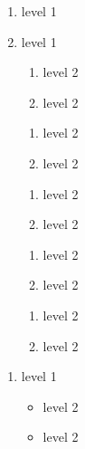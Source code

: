 \usepackage[shortlabels, inline]{enumitem}

\begin{enumerate}
    \item level 1
    \item level 1
    \begin{enumerate}[label=\Roman*., start=3]
        \item level 2
        \item level 2
    \end{enumerate}
    \begin{enumerate}[nolistsep, label=\alph*)]
        \item level 2
        \item level 2
    \end{enumerate}
    \begin{enumerate}[label=\alph*)]
        \item level 2
        \item level 2
    \end{enumerate}
    \begin{enumerate}[resume*]
        \item level 2
        \item level 2
    \end{enumerate}
    \begin{enumerate}[(1)]
        \item level 2
        \item level 2
    \end{enumerate} 
\end{enumerate}
\begin{enumerate}
    \item level 1
    \begin{itemize}
        \item level 2 
        \item level 2
    \end{itemize}
\end{enumerate}
